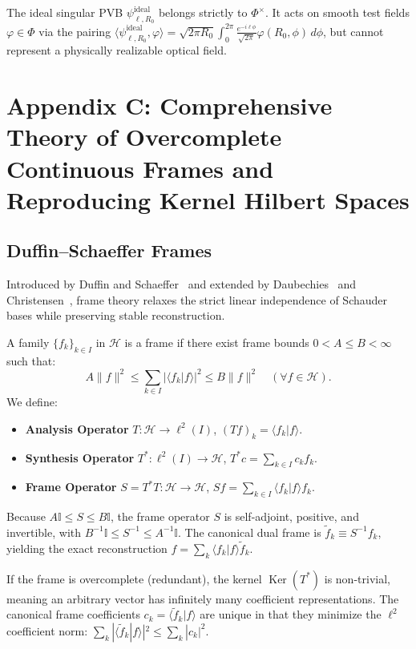 \documentclass[11pt,a4paper]{article}
\begin{document}
The ideal singular PVB $\psi_{\ell, R_0}^{\text{ideal}}$ belongs strictly to $\Phi^\times$. It acts on smooth test fields $\varphi \in \Phi$ via the pairing $\langle \psi_{\ell, R_0}^{\text{ideal}}, \varphi \rangle = \sqrt{2\pi R_0} \int_0^{2\pi} \frac{e^{-i \ell \phi}}{\sqrt{2\pi}} \varphi(R_0, \phi) \, d\phi$, but cannot represent a physically realizable optical field.

\section{Appendix C: Comprehensive Theory of Overcomplete Continuous Frames and Reproducing Kernel Hilbert Spaces}
\label{app:frames}

\subsection{Duffin--Schaeffer Frames}

Introduced by Duffin and Schaeffer~\cite{Duffin1952} and extended by Daubechies~\cite{Daubechies1990} and Christensen~\cite{Christensen2016}, frame theory relaxes the strict linear independence of Schauder bases while preserving stable reconstruction.

A family $\{f_k\}_{k \in I}$ in $\mathcal{H}$ is a frame if there exist frame bounds $0 < A \le B < \infty$ such that:
\begin{equation}
A \|f\|^2 \le \sum_{k \in I} |\langle f_k | f \rangle|^2 \le B \|f\|^2 \quad (\forall f \in \mathcal{H}).
\label{eq:app_discrete_frame}
\end{equation}
We define:
\begin{itemize}
    \item \textbf{Analysis Operator} $T: \mathcal{H} \to \ell^2(I)$, $(T f)_k = \langle f_k | f \rangle$.
    \item \textbf{Synthesis Operator} $T^*: \ell^2(I) \to \mathcal{H}$, $T^* c = \sum_{k \in I} c_k f_k$.
    \item \textbf{Frame Operator} $S = T^* T: \mathcal{H} \to \mathcal{H}$, $S f = \sum_{k \in I} \langle f_k | f \rangle f_k$.
\end{itemize}
Because $A \mathbb{I} \le S \le B \mathbb{I}$, the frame operator $S$ is self-adjoint, positive, and invertible, with $B^{-1} \mathbb{I} \le S^{-1} \le A^{-1} \mathbb{I}$. The canonical dual frame is $\widetilde{f}_k \equiv S^{-1} f_k$, yielding the exact reconstruction $f = \sum_k \langle f_k | f \rangle \widetilde{f}_k$.

If the frame is overcomplete (redundant), the kernel $\operatorname{Ker}(T^*)$ is non-trivial, meaning an arbitrary vector has infinitely many coefficient representations. The canonical frame coefficients $c_k = \langle \widetilde{f}_k | f \rangle$ are unique in that they minimize the $\ell^2$ coefficient norm: $\sum_k |\langle \widetilde{f}_k | f \rangle|^2 \le \sum_k |c_k|^2$.
\end{document}
